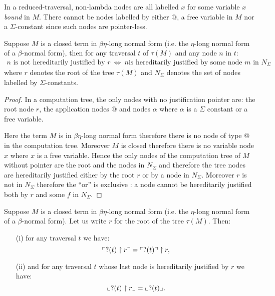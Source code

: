 In a reduced-traversal, non-lambda nodes are all labelled
$x$ for some variable $x$ \emph{bound} in $M$. There cannot be nodes
labelled by either $@$, a free variable in $M$ nor a
$\Sigma$-constant since such nodes are pointer-less.


\begin{property}
\label{proper:betaeta_trav}
Suppose $M$ is a closed term in $\beta \eta$-long normal form (i.e. the $\eta$-long normal form of a $\beta$-normal form), then
for any traversal $t$ of $\tau(M)$ and any node $n$ in $t$:
\begin{eqnarray*}
n \mbox{ is not hereditarily justified by } r  \  \iff \   n \mbox{
is hereditarily justified by some node $m$ in } N_\Sigma
\end{eqnarray*}
where $r$ denotes the root of the tree
$\tau(M)$ and $N_\Sigma$ denotes the set of nodes labelled by $\Sigma$-constants.
\end{property}
\begin{proof}
In a computation tree, the only nodes with no justification pointer are:
the root node $r$, the application nodes $@$ and nodes $\alpha$ where $\alpha$ is a $\Sigma$ constant or a free variable.

Here the term $M$ is in $\beta \eta$-long normal form therefore there is no node of type $@$ in the computation tree.
Moreover $M$ is closed therefore there is no variable node $x$ where $x$ is a
free variable. Hence the only nodes of the computation tree of $M$ without pointer are the root and the nodes in $N_\Sigma$
and therefore the tree nodes are hereditarily justified either by the root $r$ or by a node in $N_\Sigma$. Moreover $r$ is not in
$N_\Sigma$ therefore the ``or'' is exclusive : a node cannot be hereditarily justified both by $r$ and some $f$ in $N_\Sigma$.
\end{proof}

\begin{lem}
\label{lem:redtrav_trav} Suppose $M$ is a closed term in $\beta
\eta$-long normal form (i.e. the $\eta$-long normal form of a
$\beta$-normal form). Let us write $r$ for the root of the tree
$\tau(M)$. Then:
\begin{itemize}
\item[(i)] for any traversal $t$ we have:
$$ \ulcorner ?(t) \upharpoonright  r  \urcorner = \ulcorner ?(t) \urcorner \upharpoonright r ,$$
\item[(ii)] and for any traversal $t$ whose last node is hereditarily justified by
$r$ we have:
    $$ \llcorner ?(t) \upharpoonright r  \lrcorner = \llcorner ?(t) \lrcorner.$$
\end{itemize}
\end{lem}

